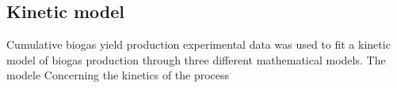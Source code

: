 \subsection{Kinetic model}
Cumulative biogas yield production experimental data was used to fit a kinetic model of biogas production through three different mathematical models. The modele
Concerning the kinetics of the process